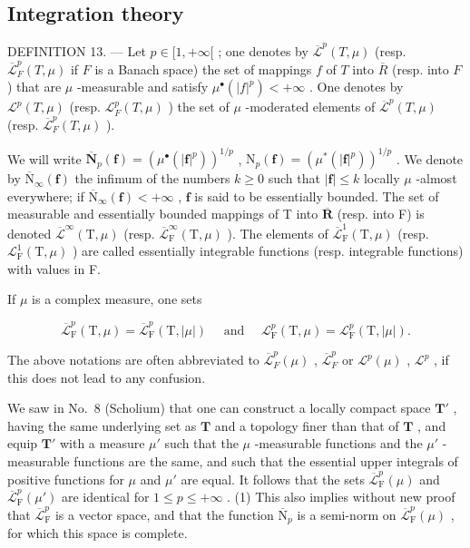\subsection{Integration theory}

DEFINITION 13. --- Let \(p \in [1, +\infty[\) ; one denotes by \(\overline{\mathcal{L}}^p(T, \mu)\) (resp. \(\overline{\mathcal{L}}_F^p(T, \mu)\) if \(F\) is a Banach space) the set of mappings \(f\) of \(T\) into \(\overline{R}\) (resp. into \(F\) ) that are \(\mu\) -measurable and satisfy \(\mu^\bullet(|f|^p) < +\infty\) . One denotes by \(\mathcal{L}^p(T, \mu)\) (resp. \(\mathcal{L}_F^p(T, \mu)\) ) the set of \(\mu\) -moderated elements of \(\overline{\mathcal{L}}^p(T, \mu)\) (resp. \(\overline{\mathcal{L}}_F^p(T, \mu)\) ).

We will write \(\overline{\mathbf{N}}_p(\mathbf{f}) = (\mu^\bullet (|\mathbf{f}|^p))^{1 / p}\) , \(\mathrm{N}_p(\mathbf{f}) = (\mu^* (|\mathbf{f}|^p))^{1 / p}\) . We denote by \(\overline{\mathrm{N}}_{\infty}(\mathbf{f})\) the infimum of the numbers \(k\geqslant 0\) such that \(|\mathbf{f}|\leqslant k\) locally \(\mu\) -almost everywhere; if \(\overline{\mathrm{N}}_{\infty}(\mathbf{f}) < + \infty\) , \(\mathbf{f}\) is said to be essentially bounded. The set of measurable and essentially bounded mappings of T into \(\overline{\mathbf{R}}\) (resp. into F) is denoted \(\overline{\mathcal{L}}^{\infty}(\mathrm{T},\mu)\) (resp. \(\overline{\mathcal{L}}_{\mathrm{F}}^{\infty}(\mathrm{T},\mu)\) ). The elements of \(\overline{\mathcal{L}}_{\mathrm{F}}^{1}(\mathrm{T},\mu)\) (resp. \(\mathcal{L}_{\mathrm{F}}^{1}(\mathrm{T},\mu)\) ) are called essentially integrable functions (resp. integrable functions) with values in F.

If \(\mu\) is a complex measure, one sets

\[
\overline {{{{\mathcal {L}}}}} _ {\mathrm{F}} ^ {p} (\mathrm{T}, \mu) = \overline {{{{\mathcal {L}}}}} _ {\mathrm{F}} ^ {p} (\mathrm{T}, | \mu |) \quad \text { and } \quad \mathcal {L} _ {\mathrm{F}} ^ {p} (\mathrm{T}, \mu) = \mathcal {L} _ {\mathrm{F}} ^ {p} (\mathrm{T}, | \mu |).
\]

The above notations are often abbreviated to \(\overline{\mathcal{L}}_F^p (\mu)\) , \(\overline{\mathcal{L}}_F^p\) or \(\mathcal{L}^p (\mu)\) , \(\mathcal{L}^p\) , if this does not lead to any confusion.

We saw in No.~8 (Scholium) that one can construct a locally compact space \(\mathbf{T}'\) , having the same underlying set as \(\mathbf{T}\) and a topology finer than that of \(\mathbf{T}\) , and equip \(\mathbf{T}'\) with a measure \(\mu'\) such that the \(\mu\) -measurable functions and the \(\mu'\) -measurable functions are the same, and such that the essential upper integrals of positive functions for \(\mu\) and \(\mu'\) are equal. It follows that the sets \(\overline{\mathcal{L}}_{\mathrm{F}}^{p}(\mu)\) and \(\overline{\mathcal{L}}_{\mathrm{F}}^{p}(\mu')\) are identical for \(1 \leqslant p \leqslant +\infty\) . (1) This also implies without new proof that \(\overline{\mathcal{L}}_{\mathrm{F}}^{p}\) is a vector space, and that the function \(\overline{\mathrm{N}}_p\) is a semi-norm on \(\overline{\mathcal{L}}_{\mathrm{F}}^{p}(\mu)\) , for which this space is complete.

